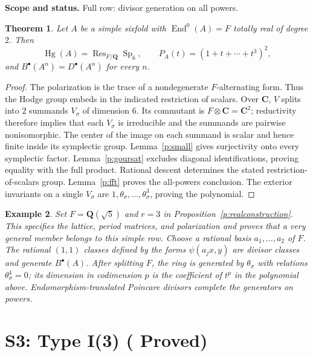 \documentclass[10pt,reqno]{article}
\theoremstyle{emphasizedplain}
\DeclareRobustCommand{\provedstatus}{%
  \texorpdfstring{\textcolor{ProvedGreen}{\textbf{Proved}}}{Proved}}
\newtheorem{theorem}{Theorem}[section]
\theoremstyle{emphasizeddefinition}
\newtheorem{example}[theorem]{Example}
\theoremstyle{emphasizeddefinition}
\DeclareMathOperator{\End}{End}
\DeclareMathOperator{\Hg}{Hg}
\DeclareMathOperator{\Sp}{Sp}
\DeclareMathOperator{\Res}{Res}
\newcommand{\Q}{\mathbf Q}
\newcommand{\C}{\mathbf C}
\newcommand{\B}{B}
\newcommand{\D}{D}
\newcommand{\status}[1]{%
  \par\nobreak\smallskip\noindent
  {\setlength{\fboxsep}{7pt}%
   \colorbox{ScopeBackground}{%
    \parbox{\dimexpr\linewidth-2\fboxsep\relax}{%
     \small\textbf{\textcolor{HeadingInk}{Scope and status.}} #1}}}%
  \par\nobreak\medskip}
\renewcommand{\small}{\fontsize{8.4}{10}\selectfont}
\begin{document}
\status{Full row: divisor generation on all powers.}
\begin{theorem}
Let $A$ be a simple sixfold with $\End^0(A)=F$ totally real of degree $2$.
Then
\[
 \Hg(A)=\Res_{F/\Q}\Sp_{6},\qquad
 P_A(t)=(1+t+\cdots+t^{3})^{2},
\]
and $\B^\bullet(A^n)=\D^\bullet(A^n)$ for every $n$.
\end{theorem}
\begin{proof}
The polarization is the trace of a nondegenerate $F$-alternating form.
Thus the Hodge group embeds in the indicated restriction of scalars.
Over $\C$, $V$ splits into $2$ summands $V_\sigma$ of dimension $6$.
Its commutant is $F\otimes\C=\C^{2}$; reductivity therefore implies that
each $V_\sigma$ is irreducible and the summands are pairwise nonisomorphic.
The center of the image on each summand is scalar and hence finite inside
its symplectic group. Lemma~\ref{p:small} gives surjectivity onto every
symplectic factor. Lemma~\ref{p:goursat} excludes diagonal identifications,
proving equality with the full product. Rational descent determines the
stated restriction-of-scalars group. Lemma~\ref{p:fft} proves the all-powers
conclusion. The exterior invariants on a single $V_\sigma$ are
$1,\theta_\sigma,\ldots,\theta_\sigma^{3}$, proving the polynomial.
\end{proof}
\begin{example}
Set $F=\Q(\sqrt5)$ and $r=3$ in
Proposition~\ref{p:realconstruction}. This specifies the lattice, period
matrices, and polarization and proves that a very general member belongs
to this simple row. Choose a rational basis $a_1,\ldots,a_{2}$ of $F$.
The rational $(1,1)$ classes defined by the forms
$\psi(a_jx,y)$ are divisor classes and generate $\B^\bullet(A)$.
After splitting $F$, the ring is generated by $\theta_\sigma$ with
relations $\theta_\sigma^{4}=0$; its dimension in codimension $p$ is the
coefficient of $t^p$ in the polynomial above. Endomorphism-translated
Poincare divisors complete the generators on powers.
\end{example}
\section{S3: Type I(3) (\provedstatus)}\label{sec:S3}
\end{document}
